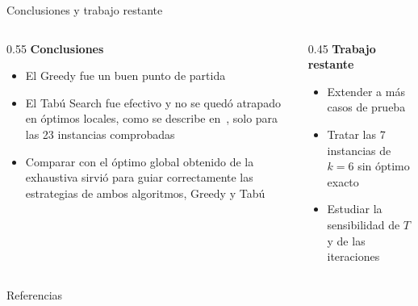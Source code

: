 \documentclass[aspectratio=169, 10pt]{beamer}
\begin{document}
\begin{frame}{Conclusiones y trabajo restante}
  \begin{columns}[T]
    \begin{column}{0.55\textwidth}
      \textbf{Conclusiones}
      \begin{itemize}
        \item El Greedy fue un buen punto de partida
        \item El Tabú Search fue efectivo y no se quedó atrapado en óptimos locales, como se describe en~\cite{Hammouche2010Comparative}, solo para las 23 instancias comprobadas
        \item Comparar con el óptimo global obtenido de la exhaustiva sirvió para guiar correctamente las estrategias de ambos algoritmos, Greedy y Tabú
      \end{itemize}
    \end{column}
    \begin{column}{0.45\textwidth}
      \textbf{Trabajo restante}
      \begin{itemize}
        \item Extender a más casos de prueba
        \item Tratar las 7 instancias de $k=6$ sin óptimo exacto
        \item Estudiar la sensibilidad de $T$ y de las iteraciones
      \end{itemize}
    \end{column}
  \end{columns}
\end{frame}

\begin{frame}[allowframebreaks]{Referencias}
  \nocite{Otsu1979, Hammouche2010Comparative, Liao2001Fast}
  
  
\end{frame}

\appendix
\end{document}
